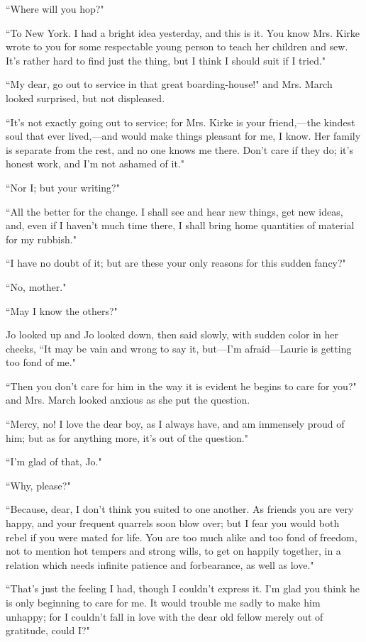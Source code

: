 ``Where will you hop?"

``To New York. I had a bright idea yesterday, and this is it. You know
Mrs. Kirke wrote to you for some respectable young person to teach her
children and sew. It's rather hard to find just the
thing, but I think I should suit if I tried."

``My dear, go out to service in that great boarding-house!" and Mrs.
March looked surprised, but not displeased.

``It's not exactly going out to service; for Mrs. Kirke
is your friend,---the kindest soul that ever lived,---and would make
things pleasant for me, I know. Her family is separate from the rest,
and no one knows me there. Don't care if they do;
it's honest work, and I'm not ashamed of
it."

``Nor I; but your writing?"

``All the better for the change. I shall see and hear new things, get new
ideas, and, even if I haven't much time there, I shall
bring home quantities of material for my rubbish."

``I have no doubt of it; but are these your only reasons for this sudden
fancy?"

``No, mother."

``May I know the others?"

Jo looked up and Jo looked down, then said slowly, with sudden color in
her cheeks, ``It may be vain and wrong to say it,
but---I'm afraid---Laurie is getting too fond of me."

``Then you don't care for him in the way it is evident he
begins to care for you?" and Mrs. March looked anxious as she put the
question.

``Mercy, no! I love the dear boy, as I always have, and am immensely
proud of him; but as for anything more, it's out of the
question."

``I'm glad of that, Jo."

``Why, please?"

``Because, dear, I don't think you suited to one another.
As friends you are very happy, and your frequent quarrels soon blow
over; but I fear you would both rebel if you were mated for life. You
are too much alike and too fond of freedom, not to mention hot tempers
and strong wills, to get on happily together, in a relation which needs
infinite patience and forbearance, as well as love."

``That's just the feeling I had, though I
couldn't express it. I'm glad you think
he is only beginning to care for me. It would trouble me sadly to make
him unhappy; for I couldn't fall in love with the dear
old fellow merely out of gratitude, could I?"

